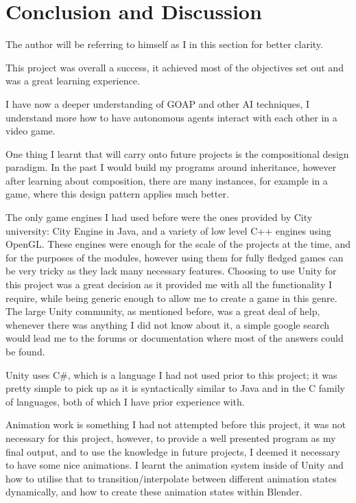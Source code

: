 \documentclass[11pt]{report}
\begin{document}
\chapter{Conclusion and Discussion}
The author will be referring to himself as I in this section for better clarity.

This project was overall a success, it achieved most of the objectives set out and was a great learning experience.

I have now a deeper understanding of GOAP and other AI techniques, I understand more how to have autonomous agents interact with each other in a video game.

One thing I learnt that will carry onto future projects is the compositional design paradigm. In the past I would build my programs around inheritance, however after learning about composition, there are many instances, for example in a game, where this design pattern applies much better.

The only game engines I had used before were the ones provided by City university: City Engine in Java, and a variety of low level C++ engines using OpenGL. These engines were enough for the scale of the projects at the time, and for the purposes of the modules, however using them for fully fledged games can be very tricky as they lack many necessary features. Choosing to use Unity for this project was a great decision as it provided me with all the functionality I require, while being generic enough to allow me to create a game in this genre. The large Unity community, as mentioned before, was a great deal of help, whenever there was anything I did not know about it, a simple google search would lead me to the forums or documentation where most of the answers could be found.

Unity uses C\#, which is a language I had not used prior to this project; it was pretty simple to pick up as it is syntactically similar to Java and in the C family of languages, both of which I have prior experience with.

Animation work is something I had not attempted before this project, it was not necessary for this project, however, to provide a well presented program as my final output, and to use the knowledge in future projects, I deemed it necessary to have some nice animations. I learnt the animation system inside of Unity and how to utilise that to transition/interpolate between different animation states dynamically, and how to create these animation states within Blender.
\end{document}
